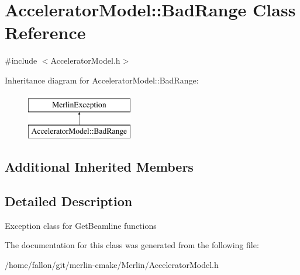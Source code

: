 \hypertarget{classAcceleratorModel_1_1BadRange}{}\section{Accelerator\+Model\+:\+:Bad\+Range Class Reference}
\label{classAcceleratorModel_1_1BadRange}


{\ttfamily \#include $<$Accelerator\+Model.\+h$>$}

Inheritance diagram for Accelerator\+Model\+:\+:Bad\+Range\+:\begin{figure}[H]
\begin{center}
\leavevmode
\includegraphics[height=2.000000cm]{classAcceleratorModel_1_1BadRange}
\end{center}
\end{figure}
\subsection*{Additional Inherited Members}


\subsection{Detailed Description}
Exception class for Get\+Beamline functions 

The documentation for this class was generated from the following file\+:\begin{DoxyCompactItemize}
\item 
/home/fallon/git/merlin-\/cmake/\+Merlin/Accelerator\+Model.\+h\end{DoxyCompactItemize}
